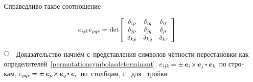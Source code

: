 \begin{otherlanguage}{russian}

Справедливо такое соотношение

\nopagebreak\vspace{-0.1em}
\begin{equation}\label{doubleveblen}
e_{i\hspace{-0.1ex}j\hspace{-0.1ex}k} \hspace{.1ex} e_{pqr}
\hspace{-0.1ex} = \hspace{.1ex}
\operatorname{det} \hspace{-0.25ex} \left[
\begin{array}{ccc}
\delta_{ip} & \delta_{iq} & \delta_{ir} \\
\delta_{\hspace{-0.1ex}j\hspace{-0.1ex}p} & \delta_{\hspace{-0.1ex}j\hspace{-0.1ex}q} & \delta_{\hspace{-0.1ex}j\hspace{-0.1ex}r} \\
\delta_{kp} & \delta_{kq} & \delta_{kr}
\end{array}\hspace{-0.1ex}
\right]
\end{equation}

\noindent
${ \tikz[baseline=-1ex] \draw [line width=.5pt, color=black, fill=white] (0, 0) circle (.8ex);
\hspace{.6em} }$
Доказательство
начнём
с~представления
символов чётности перестановки
как определителей~\eqref{permutationsymbolasdeterminant}.
${ e_{i\hspace{-0.1ex}j\hspace{-0.1ex}k} \hspace{-0.2ex}
= \pm \hspace{.4ex}
\bm{e}_i \hspace{-0.36ex} \times \hspace{-0.2ex} \bm{e}_j \hspace{-0.15ex} \dotp \hspace{.1ex} \bm{e}_k }$ по строкам,
${ e_{pqr} \hspace{-0.2ex}
= \pm \hspace{.4ex}
\bm{e}_p \hspace{-0.36ex} \times \hspace{-0.2ex} \bm{e}_q \hspace{-0.15ex} \dotp \hspace{.1ex} \bm{e}_r }$ по~столбцам,
с~\inquotes{$-$} для~ тройки


\end{otherlanguage}
